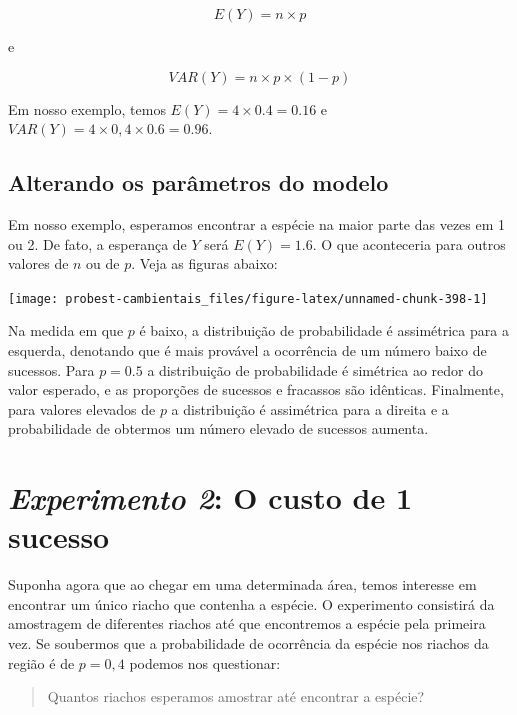 \documentclass[
]{book}
\begin{document}
\[E(Y) = n \times p\]

e

\[VAR(Y) = n \times p \times (1-p)\]

Em nosso exemplo, temos \(E(Y) = 4 \times 0.4 = 0.16\) e \(VAR(Y) = 4 \times 0,4 \times 0.6 = 0.96\).

\hypertarget{alterando-os-paruxe2metros-do-modelo}{%
\subsection*{Alterando os parâmetros do modelo}\label{alterando-os-paruxe2metros-do-modelo}}

Em nosso exemplo, esperamos encontrar a espécie na maior parte das vezes em 1 ou 2. De fato, a esperança de \(Y\) será \(E(Y) = 1.6\). O que aconteceria para outros valores de \(n\) ou de \(p\). Veja as figuras abaixo:

\begin{center}\texttt{[image: probest-cambientais\_files/figure-latex/unnamed-chunk-398-1]} \end{center}

Na medida em que \(p\) é baixo, a distribuição de probabilidade é assimétrica para a esquerda, denotando que é mais provável a ocorrência de um número baixo de sucessos. Para \(p = 0.5\) a distribuição de probabilidade é simétrica ao redor do valor esperado, e as proporções de sucessos e fracassos são idênticas. Finalmente, para valores elevados de \(p\) a distribuição é assimétrica para a direita e a probabilidade de obtermos um número elevado de sucessos aumenta.

\hypertarget{experimento-2-o-custo-de-1-sucesso}{%
\section{\texorpdfstring{\emph{Experimento 2}: O custo de 1 sucesso}{Experimento 2: O custo de 1 sucesso}}\label{experimento-2-o-custo-de-1-sucesso}}

Suponha agora que ao chegar em uma determinada área, temos interesse em encontrar um único riacho que contenha a espécie. O experimento consistirá da amostragem de diferentes riachos até que encontremos a espécie pela primeira vez. Se soubermos que a probabilidade de ocorrência da espécie nos riachos da região é de \(p = 0,4\) podemos nos questionar:

\begin{quote}
Quantos riachos esperamos amostrar até encontrar a espécie?
\end{quote}
\end{document}

